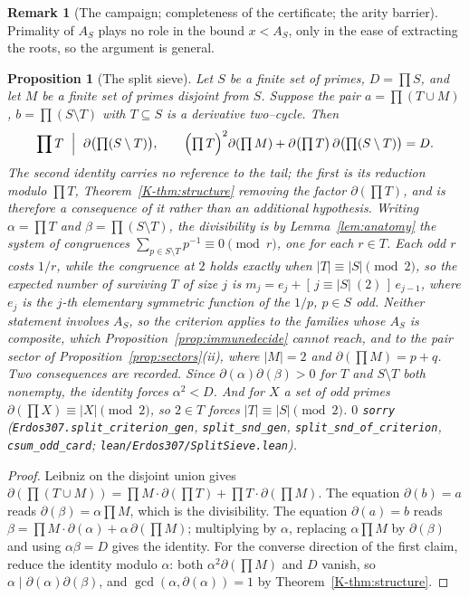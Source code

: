 \documentclass[11pt]{article}
\newtheorem{proposition}[theorem]{Proposition}
\theoremstyle{definition}
\newtheorem{remark}[theorem]{Remark}
\begin{document}
\begin{remark}[The campaign; completeness of the certificate; the arity barrier]
Primality of $A_S$ plays no role in the bound $x<A_S$, only in the ease of extracting the roots, so
the argument is general.

\begin{proposition}[The split sieve]\label{prop:splitsieve}
Let $S$ be a finite set of primes, $D=\prod S$, and let $M$ be a finite set of primes disjoint from
$S$. Suppose the pair $a=\prod(T\cup M)$, $b=\prod(S\setminus T)$ with $T\subseteq S$ is a
derivative two--cycle. Then
\[ \prod T\ \Bigm|\ \partial\bigl(\textstyle\prod(S\setminus T)\bigr),
   \qquad
   \Bigl(\textstyle\prod T\Bigr)^{2}\partial(\textstyle\prod M)
   +\partial\bigl(\textstyle\prod T\bigr)\,\partial\bigl(\textstyle\prod(S\setminus T)\bigr)=D . \]
The second identity carries no reference to the tail; the first is its reduction modulo $\prod T$,
Theorem~\ref{K-thm:structure} removing the factor $\partial(\prod T)$, and is therefore a consequence
of it rather than an additional hypothesis. Writing $\alpha=\prod T$ and $\beta=\prod(S\setminus T)$,
the divisibility is by Lemma~\ref{lem:anatomy} the system of congruences
$\sum_{p\in S\setminus T}p^{-1}\equiv0\pmod r$, one for each $r\in T$. Each odd $r$ costs $1/r$, while the
congruence at $2$ holds exactly when $|T|\equiv|S|\pmod 2$, so the expected number of surviving $T$ of size $j$ is
$m_j=e_j+[\,j\equiv|S|\ (2)\,]\,e_{j-1}$, where $e_j$ is the $j$-th elementary symmetric function of the $1/p$,
$p\in S$ odd. Neither statement involves $A_S$, so the
criterion applies to the families whose $A_S$ is composite, which
Proposition~\ref{prop:immunedecide} cannot reach, and to the pair sector of
Proposition~\ref{prop:sectors}(ii), where $|M|=2$ and $\partial(\prod M)=p+q$. Two consequences are
recorded. Since $\partial(\alpha)\partial(\beta)>0$ for $T$ and $S\setminus T$ both nonempty, the
identity forces $\alpha^{2}<D$. And for $X$ a set of odd primes $\partial(\prod X)\equiv|X|\pmod2$,
so $2\in T$ forces $|T|\equiv|S|\pmod2$. $0$ \texttt{sorry}
\textup{(\texttt{Erdos307.split\_criterion\_gen}, \texttt{split\_snd\_gen},
\texttt{split\_snd\_of\_criterion}, \texttt{csum\_odd\_card};
\texttt{lean/Erdos307/SplitSieve.lean})}.
\end{proposition}
\begin{proof}
Leibniz on the disjoint union gives $\partial(\prod(T\cup M))=\prod M\cdot\partial(\prod T)
+\prod T\cdot\partial(\prod M)$. The equation $\partial(b)=a$ reads
$\partial(\beta)=\alpha\prod M$, which is the divisibility. The equation $\partial(a)=b$ reads
$\beta=\prod M\cdot\partial(\alpha)+\alpha\,\partial(\prod M)$; multiplying by $\alpha$, replacing
$\alpha\prod M$ by $\partial(\beta)$ and using $\alpha\beta=D$ gives the identity. For the converse
direction of the first claim, reduce the identity modulo $\alpha$: both $\alpha^{2}\partial(\prod M)$
and $D$ vanish, so $\alpha\mid\partial(\alpha)\partial(\beta)$, and
$\gcd(\alpha,\partial(\alpha))=1$ by Theorem~\ref{K-thm:structure}.
\end{proof}


\end{remark}
\end{document}
